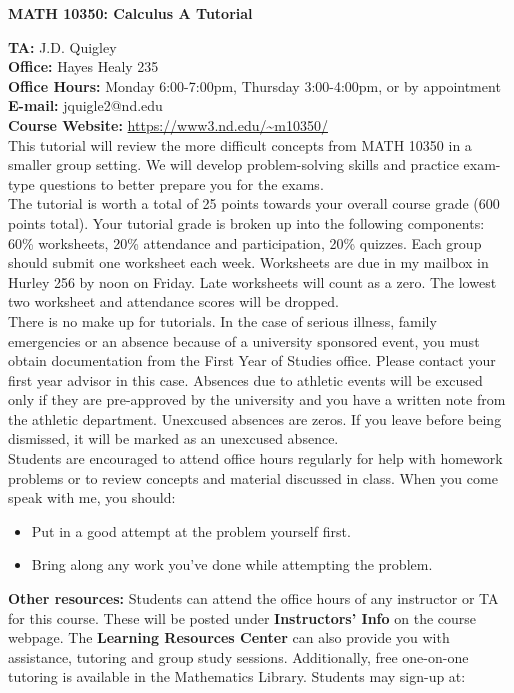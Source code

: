 \documentclass{article}[12pt]
\begin{document}
\begin{center}{\bf MATH 10350: Calculus A Tutorial} \end{center}
{\bf TA:} J.D. Quigley\\
{\bf Office:} Hayes Healy 235\\
{\bf Office Hours:} Monday 6:00-7:00pm, Thursday 3:00-4:00pm, or by appointment\\
{\bf E-mail:} jquigle2@nd.edu\\
{\bf Course Website:} \url{https://www3.nd.edu/~m10350/}\\

 This tutorial will review the more difficult concepts from MATH 10350 in a smaller group setting. We will develop problem-solving skills and practice exam-type questions to better prepare you for the exams.\\

 The tutorial is worth a total of 25 points towards your overall course grade (600 points total). Your tutorial grade is broken up into the following components: 60\% worksheets, 20\% attendance and participation, 20\% quizzes. Each group should submit one worksheet each week. Worksheets are due in my mailbox in Hurley 256 by noon on Friday. Late worksheets will count as a zero. The lowest two worksheet and attendance scores will be dropped. \\

 There is no make up for tutorials. In the case of serious illness, family emergencies or an absence because of a university sponsored event, you must obtain documentation from the First Year of Studies office. Please contact your first year advisor in this case. Absences due to athletic events will be excused only if they are pre-approved by the university and you have a written note from the athletic department.  Unexcused absences are zeros. If you leave before being dismissed, it will be marked as an unexcused absence. \\

 Students are encouraged to attend office hours regularly for help with homework problems or to review concepts and material discussed in class. When you come speak with me, you should:
\begin{itemize}
\item Put in a good attempt at the problem yourself first. 
\item Bring along any work you've done while attempting the problem. 
\end{itemize}
{\bf Other resources:} Students can attend the office hours of any instructor or TA for this course. These will be posted under {\bf Instructors' Info} on the course webpage. The {\bf Learning Resources Center} can also provide you with assistance, tutoring and group study sessions. Additionally, free one-on-one tutoring is available in the Mathematics Library. Students may sign-up at:
\end{document}
